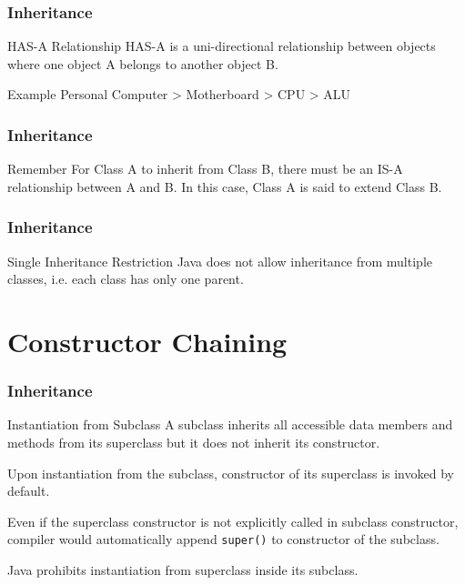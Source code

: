\documentclass[10pt, compress]{beamer}
\begin{document}
\begin{frame}[fragile]
  \frametitle{Inheritance}
  \begin{block}{HAS-A Relationship}
    \alert{HAS-A} is a uni-directional relationship between objects where one object A belongs to another object B.
  \end{block}
  \begin{block}{Example}
  Personal Computer > Motherboard > CPU > ALU
  \end{block}
\end{frame}

\begin{frame}[fragile]
  \frametitle{Inheritance}
  \begin{block}{Remember}
    For Class A to inherit from Class B, there must be an \alert{IS-A} relationship between A and B. In this case, Class A is said to extend Class B.
  \end{block}
\end{frame}

\begin{frame}[fragile]
  \frametitle{Inheritance}
  \begin{block}{Single Inheritance Restriction}
    Java does not allow inheritance from multiple classes, i.e. each class has only one parent.
  \end{block}
\end{frame}

\section{Constructor Chaining}

\begin{frame}[fragile]
  \frametitle{Inheritance}
  \begin{block}{Instantiation from Subclass}
    A subclass inherits all accessible data members and methods from its superclass but it does not inherit its constructor.

    Upon instantiation from the subclass, constructor of its superclass is invoked by default.

    Even if the superclass constructor is not explicitly called in subclass constructor, compiler would automatically append \texttt{super()} to constructor of the subclass.

    Java prohibits instantiation from superclass inside its subclass.
  \end{block}
\end{frame}
\end{document}
